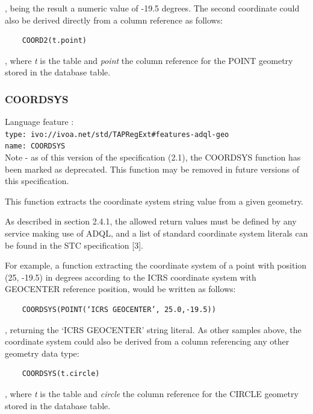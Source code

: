 \documentclass[11pt,a4paper]{ivoa}
\begin{document}
, being the result a numeric value of -19.5 degrees. The second coordinate
could also be derived directly from a column reference as follows:

\begin{verbatim}
    COORD2(t.point)
\end{verbatim}

, where \textit{t} is the table and \textit{point} the column reference for
the POINT geometry stored in the database table.

\subsubsection{COORDSYS}
\label{sec:geom.functions.coordsys}
{\footnotesize Language feature :}\\
{\footnotesize \verb|type: ivo://ivoa.net/std/TAPRegExt#features-adql-geo|}\\
{\footnotesize \verb|name: COORDSYS|}\\

Note - as of this version of the specification (2.1), the COORDSYS function has
been marked as deprecated. This function may be removed in future versions
of this specification.

This function extracts the coordinate system string value from a given
geometry.

As described in section 2.4.1, the allowed return values must be defined
by any service making use of ADQL, and a list of standard coordinate system
literals can be found in the STC specification [3].

For example, a function extracting the coordinate system of a point with
position (25, -19.5) in degrees according to the ICRS coordinate system with
GEOCENTER reference position, would be written as follows:

\begin{verbatim}
    COORDSYS(POINT(‘ICRS GEOCENTER’, 25.0,-19.5))
\end{verbatim}

, returning the ‘ICRS GEOCENTER’ string literal. As other samples above,
the coordinate system could also be derived from a column referencing any
other geometry data type:

\begin{verbatim}
    COORDSYS(t.circle)
\end{verbatim}

, where \textit{t} is the table and \textit{circle} the column reference
for the CIRCLE geometry stored in the database table.
\end{document}
